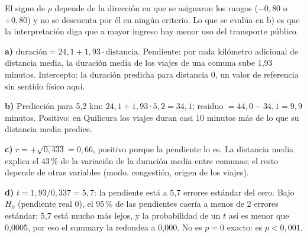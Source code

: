 \documentclass[11pt]{article}
\newcommand{\pregunta}[1]{\vspace{10pt}{\large\bfseries #1}\vspace{4pt}\par}
\newcommand{\bloque}[1]{\vspace{6pt}{\bfseries #1}\vspace{2pt}\par}
\begin{document}
El signo de $\rho$ depende de la dirección en que se asignaron los rangos ($-0{,}80$ o $+0{,}80$) y no se descuenta por él en ningún criterio. Lo que se evalúa en b) es que la interpretación diga que a mayor ingreso hay menor uso del transporte público.

\clearpage
\pregunta{Pregunta 4: regresión lineal por comuna, inferencia y bootstrap (25 puntos)}

\bloque{Respuesta esperada}

\textbf{a)} $\text{duración} = 24{,}1 + 1{,}93 \cdot \text{distancia}$. Pendiente: por cada kilómetro adicional de distancia media, la duración media de los viajes de una comuna sube 1,93 minutos. Intercepto: la duración predicha para distancia 0, un valor de referencia sin sentido físico aquí.

\medskip
\textbf{b)} Predicción para 5,2 km: $24{,}1 + 1{,}93 \cdot 5{,}2 = 34{,}1$; residuo $= 44{,}0 - 34{,}1 = 9{,}9$ minutos. Positivo: en Quilicura los viajes duran casi 10 minutos más de lo que su distancia media predice.

\medskip
\textbf{c)} $r = +\sqrt{0{,}433} = 0{,}66$, positivo porque la pendiente lo es. La distancia media explica el 43\,\% de la variación de la duración media entre comunas; el resto depende de otras variables (modo, congestión, origen de los viajes).

\medskip
\textbf{d)} $t = 1{,}93 / 0{,}337 = 5{,}7$: la pendiente está a 5,7 errores estándar del cero. Bajo $H_0$ (pendiente real 0), el 95\,\% de las pendientes caería a menos de 2 errores estándar; 5,7 está mucho más lejos, y la probabilidad de un $t$ así es menor que 0,0005, por eso el summary la redondea a 0,000. No es $p = 0$ exacto: es $p < 0{,}001$.
\end{document}
